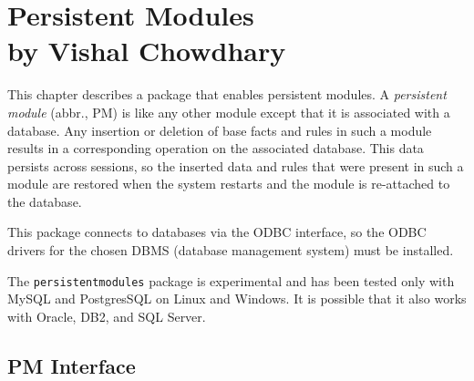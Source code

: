 \chapter[Persistent Modules]{Persistent Modules\\{\Large by Vishal Chowdhary}}



\newcommand{\psm}{\mbox{PM}\xspace}

This chapter describes a \FLSYSTEM package that enables persistent modules.  A
\emph{persistent module} (abbr., \psm) is like any other \FLSYSTEM module
except that it is associated with a database. Any insertion or deletion of
base facts and rules
in such a module results in a corresponding operation on the
associated database. This data persists across \FLSYSTEM sessions, so the
inserted data and rules
that were present in such a module are restored when the system restarts and
the module is re-attached to the database.

This package connects to databases via the ODBC interface, so the ODBC
drivers for the chosen DBMS (database management system) must be installed.
  
The \texttt{persistentmodules} package is experimental and has been tested
only with MySQL and PostgresSQL on Linux and Windows. It is possible that
it also works with Oracle, DB2, and SQL Server. 

\section{PM Interface}

